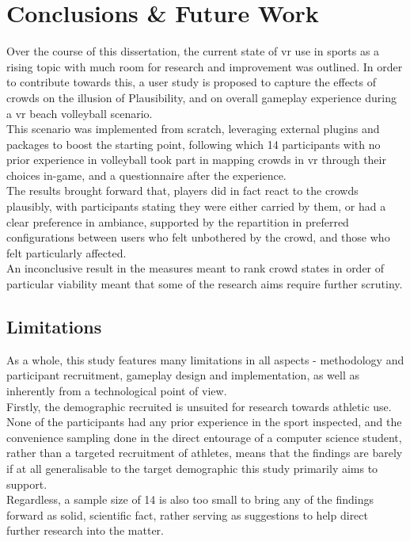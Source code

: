 \chapter{Conclusions \& Future Work}
\label{chap::conclusion-6}

Over the course of this dissertation, the current state of \gls{vr} use in sports as a rising topic with much room for research and improvement was outlined. In order to contribute towards this, a user study is proposed to capture the effects of crowds on the illusion of Plausibility, and on overall gameplay experience during a \gls{vr} beach volleyball scenario.\\
This scenario was implemented from scratch, leveraging external plugins and packages to boost the starting point, following which 14 participants with no prior experience in volleyball took part in mapping crowds in vr through their choices in-game, and a questionnaire after the experience.\\

The results brought forward that, players did in fact react to the crowds plausibly, with participants stating they were either carried by them, or had a clear preference in ambiance, supported by the repartition in preferred configurations between users who felt unbothered by the crowd, and those who felt particularly affected.\\
An inconclusive result in the measures meant to rank crowd states in order of particular viability meant that some of the research aims require further scrutiny.

\section{Limitations}

As a whole, this study features many limitations in all aspects - methodology and participant recruitment, gameplay design and implementation, as well as inherently from a technological point of view.\\

Firstly, the demographic recruited is unsuited for research towards athletic use. None of the participants had any prior experience in the sport inspected, and the convenience sampling done in the direct entourage of a computer science student, rather than a targeted recruitment of athletes, means that the findings are barely if at all generalisable to the target demographic this study primarily aims to support.\\
Regardless, a sample size of 14 is also too small to bring any of the findings forward as solid, scientific fact, rather serving as suggestions to help direct further research into the matter.\\

